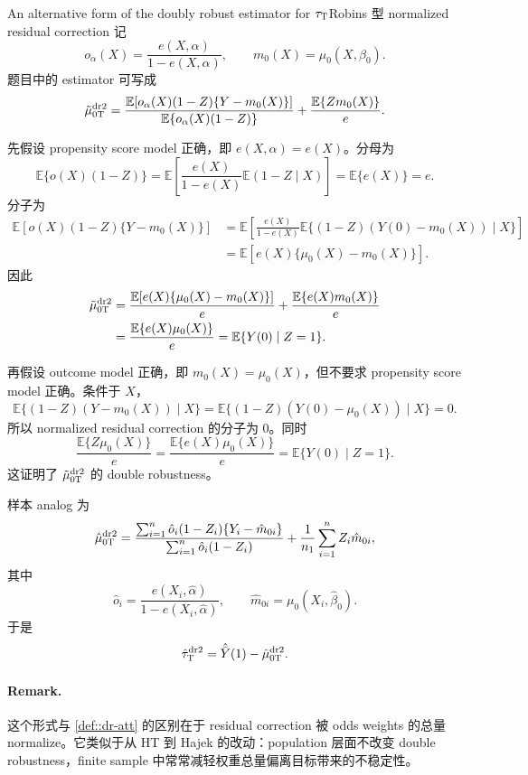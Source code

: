 \begin{exercisesolution}{An alternative form of the doubly robust estimator for $\tau_\textsc{T}$}{Robins 型 normalized residual correction}
记
\[
o_\alpha(X)=\frac{e(X,\alpha)}{1-e(X,\alpha)},\qquad
m_0(X)=\mu_0(X,\beta_0).
\]
题目中的 estimator 可写成
\[
\tilde{\mu}_{0\textsc{T}}^\textup{dr2}
=\frac{\mathbb{E}[o_\alpha(X)(1-Z)\{Y-m_0(X)\}]}
        {\mathbb{E}\{o_\alpha(X)(1-Z)\}}
 +\frac{\mathbb{E}\{Zm_0(X)\}}{e}.
\]

先假设 propensity score model 正确，即 $e(X,\alpha)=e(X)$。分母为
\[
\mathbb{E}\{o(X)(1-Z)\}
=\mathbb{E}\left[
\frac{e(X)}{1-e(X)}\mathbb{E}(1-Z\mid X)
\right]
=\mathbb{E}\{e(X)\}=e.
\]
分子为
\begin{align*}
\mathbb{E}[o(X)(1-Z)\{Y-m_0(X)\}]
&=\mathbb{E}\left[
\frac{e(X)}{1-e(X)}
\mathbb{E}\{(1-Z)(Y(0)-m_0(X))\mid X\}
\right] \\
&=\mathbb{E}\left[e(X)\{\mu_0(X)-m_0(X)\}\right].
\end{align*}
因此
\begin{align*}
\tilde{\mu}_{0\textsc{T}}^\textup{dr2}
&=\frac{\mathbb{E}[e(X)\{\mu_0(X)-m_0(X)\}]}{e}
  +\frac{\mathbb{E}\{e(X)m_0(X)\}}{e} \\
&=\frac{\mathbb{E}\{e(X)\mu_0(X)\}}{e}
=\mathbb{E}\{Y(0)\mid Z=1\}.
\end{align*}

再假设 outcome model 正确，即 $m_0(X)=\mu_0(X)$，但不要求 propensity score model 正确。条件于 $X$，
\[
\mathbb{E}\{(1-Z)(Y-m_0(X))\mid X\}
=\mathbb{E}\{(1-Z)(Y(0)-\mu_0(X))\mid X\}=0.
\]
所以 normalized residual correction 的分子为 $0$。同时
\[
\frac{\mathbb{E}\{Z\mu_0(X)\}}{e}
=\frac{\mathbb{E}\{e(X)\mu_0(X)\}}{e}
=\mathbb{E}\{Y(0)\mid Z=1\}.
\]
这证明了 $\tilde{\mu}_{0\textsc{T}}^\textup{dr2}$ 的 double robustness。

样本 analog 为
\[
\hat{\mu}_{0\textsc{T}}^\textup{dr2}
=
\frac{\sum_{i=1}^n \hat o_i(1-Z_i)\{Y_i-\hat m_{0i}\}}
     {\sum_{i=1}^n \hat o_i(1-Z_i)}
+\frac{1}{n_1}\sum_{i=1}^n Z_i\hat m_{0i},
\]
其中
\[
\hat o_i=\frac{e(X_i,\hat\alpha)}{1-e(X_i,\hat\alpha)},\qquad
\hat m_{0i}=\mu_0(X_i,\hat\beta_0).
\]
于是
\[
\hat\tau_\textsc{T}^\textup{dr2}
=\hat{\bar Y}(1)-\hat{\mu}_{0\textsc{T}}^\textup{dr2}.
\]

\paragraph{Remark.}
这个形式与 \cref{def::dr-att} 的区别在于 residual correction 被 odds weights 的总量 normalize。它类似于从 HT 到 Hajek 的改动：population 层面不改变 double robustness，finite sample 中常常减轻权重总量偏离目标带来的不稳定性。
\end{exercisesolution}

